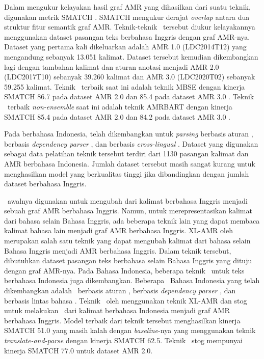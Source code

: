 Dalam mengukur kelayakan hasil graf \gls{AMR} yang dihasilkan dari suatu teknik, digunakan metrik \gls{SMATCH} .
SMATCH mengukur derajat \textit{overlap} antara dua struktur fitur semantik graf \gls{AMR}.
Teknik-teknik \amrparsing~tersebut diukur kelayakannya menggunakan dataset pasangan teks berbahasa Inggris dengan graf AMR-nya.
Dataset yang pertama kali dikeluarkan adalah AMR 1.0 (LDC2014T12) yang mengandung sebanyak 13.051 kalimat.
Dataset tersebut kemudian dikembangkan lagi dengan tambahan kalimat dan aturan anotasi menjadi AMR 2.0 (LDC2017T10) sebanyak 39.260 kalimat dan AMR 3.0 (LDC2020T02) sebanyak 59.255 kalimat.
Teknik \amrparsing~terbaik saat ini adalah teknik MBSE dengan kinerja SMATCH 86.7 pada dataset \gls{AMR} 2.0 dan 85.4 pada dataset \gls{AMR} 3.0 .
Teknik \amrparsing~terbaik \textit{non-ensemble} saat ini adalah teknik AMRBART dengan kinerja SMATCH 85.4 pada dataset \gls{AMR} 2.0 dan 84.2 pada dataset \gls{AMR} 3.0 .


Pada \amrparsing berbahasa Indonesia, telah dikembangkan untuk \textit{parsing} berbasis aturan , berbasis \textit{dependency parser} , dan berbasis \textit{cross-lingual} .
Dataset yang digunakan sebagai data pelatihan teknik tersebut terdiri dari 1130 pasangan kalimat dan AMR berbahasa Indonesia.
Jumlah dataset tersebut masih sangat kurang untuk menghasilkan model yang berkualitas tinggi jika dibandingkan dengan jumlah dataset berbahasa Inggris.

\amrparsing~awalnya digunakan untuk mengubah dari kalimat berbahasa Inggris menjadi sebuah graf \gls{AMR} berbahasa Inggris.
Namun, untuk merepresentasikan kalimat dari bahasa selain Bahasa Inggris, ada beberapa teknik lain yang dapat membaca kalimat bahasa lain menjadi graf \gls{AMR} berbahasa Inggris.
\gls{XL-AMR} oleh \textcite{blloshmi2020} merupakan salah satu teknik yang dapat mengubah kalimat dari bahasa selain Bahasa Inggris menjadi \gls{AMR} berbahasa Inggris.
Dalam teknik tersebut, dibutuhkan dataset pasangan teks berbahasa selain Bahasa Inggris yang dituju dengan graf \gls{AMR}-nya.
Pada Bahasa Indonesia, beberapa teknik \amrparsing~untuk teks berbahasa Indonesia juga dikembangkan.
Beberapa \amrparsing~Bahasa Indonesia yang telah dikembangkan adalah \amrparsing~berbasis aturan , berbasis \textit{dependency parser} , dan berbasis lintas bahasa .
Teknik \amrparsing~oleh \textcite{putra2022} menggunakan teknik XL-\gls{AMR} dan stog untuk melakukan \amrparsing~dari kalimat berbahasa Indonesia menjadi graf \gls{AMR} berbahasa Inggris.
Model terbaik dari teknik tersebut menghasilkan kinerja SMATCH 51.0 yang masih kalah dengan \textit{baseline}-nya yang menggunakan teknik \textit{translate-and-parse} dengan kinerja SMATCH 62.5.
Teknik \amrparsing~stog mempunyai kinerja SMATCH 77.0 untuk dataset \gls{AMR} 2.0.

